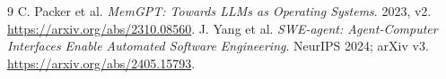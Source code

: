 \begin{thebibliography}{9}
 C. Packer et al. \emph{MemGPT: Towards LLMs as
Operating Systems}. 2023, v2. \url{https://arxiv.org/abs/2310.08560}.
 J. Yang et al. \emph{SWE-agent: Agent-Computer Interfaces
Enable Automated Software Engineering}. NeurIPS 2024; arXiv v3.
\url{https://arxiv.org/abs/2405.15793}.
\end{thebibliography}
